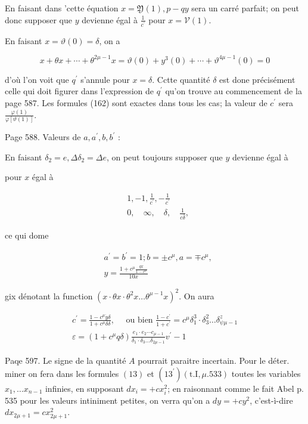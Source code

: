 \documentclass{article}
\begin{document}
En faisant dans 'cette équation \(x=\mathfrak{Y}(1), p-q y\) sera un carré parfait; on peut donc supposer que \(y\) devienne égal à \(\frac{1}{c^{\prime}}\) pour \(x=\mathcal{V}(1)\).

En faisant \(x=\vartheta(0)=\delta\), on a

\[
x+\theta x+\cdots+\theta^{2 \mu-1} x=\vartheta(0)+y^{3}(0)+\cdots+\vartheta^{4 \mu-1}(0)=0
\]

d'où l'on voit que \(q^{\prime}\) s'annule pour \(x=\delta\). Cctte quantité \(\delta\) est done précisément celle qui doit figurer dans l'expression de \(q^{\prime}\) qu'on trouve au commencement de la page 587. Les formules (162) sont exactes dans tous les cas; la valeur de \(c^{\prime}\) sera \(\frac{\varphi(1)}{\varphi[\mathcal{\vartheta}(1)]}\).

Page 588. Valeurs de \(a, a^{\prime}, b, b^{\prime}\) :

En faisant \(\delta_{2}=e, \Delta \delta_{2}=\Delta e\), on peut toujours supposer que \(y\) devienne égal à

pour \(x\) égal à

\[
\begin{aligned}
& 1,-1, \frac{1}{c^{\prime}},-\frac{1}{c^{\prime}} \\
& 0, \quad \infty, \quad \delta, \quad \frac{1}{c \bar{\delta}},
\end{aligned}
\]

ce qui dome

\[
\begin{aligned}
& a^{\prime}=b^{\prime}=1 ; b= \pm c^{\mu}, a=\mp c^{\mu}, \\
& y=\frac{1+c^{\mu} \frac{q x}{1-c^{\mu}}}{10 x}
\end{aligned}
\]

gix dénotant la function \(\left(x \cdot \theta x \cdot \theta^{2} x \ldots \theta^{\mu-1} x\right)^{2}\). On aura

\[
\begin{gathered}
c^{\prime}=\frac{1-c^{\mu} \dot{y} \delta}{1+c^{\mu} \delta \delta}, \quad \text { ou bien } \frac{1-c^{\prime}}{1+c^{\prime}}=c^{\mu} \delta_{1}^{3} \cdot \delta_{3}^{2} \ldots \delta_{\psi \mu-1}^{z} \\
\varepsilon=\left(1+c^{\mu} q \delta\right) \frac{e_{1} \cdot e_{2} \cdots c_{\mu-1}}{\delta_{1} \cdot \delta_{3} \ldots \delta_{2 \mu-1}} v^{\prime}-1
\end{gathered}
\]

Paqe 597. Le signe de la quantité \(A\) pourrait paraitre incertain. Pour le déter. miner on fera dans les formules \((13)\) et \(\left(13^{\prime}\right)(\mathrm{t} . \mathrm{I}, \mu .533)\) toutes les variables \(x_{1}, \ldots x_{n-1}\) infinies, en supposant \(d x_{i}=+c x_{i}^{2}\); en raisonnant comme le fait Abel p. 535 pour les valeurs intiniment petites, on verra qu'on a \(d y=+c y^{2}\), c'est-ì-dire \(d x_{2 \mu+1}=c x_{2 \mu+1}^{2}\).
\end{document}
